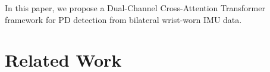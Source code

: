 \documentclass[conference]{IEEEtran}
\begin{document}
In this paper, we propose a Dual-Channel Cross-Attention Transformer framework for PD detection from bilateral wrist-worn IMU data.
\begin{itemize}
\end{itemize}



\section{Related Work}
\end{document}
